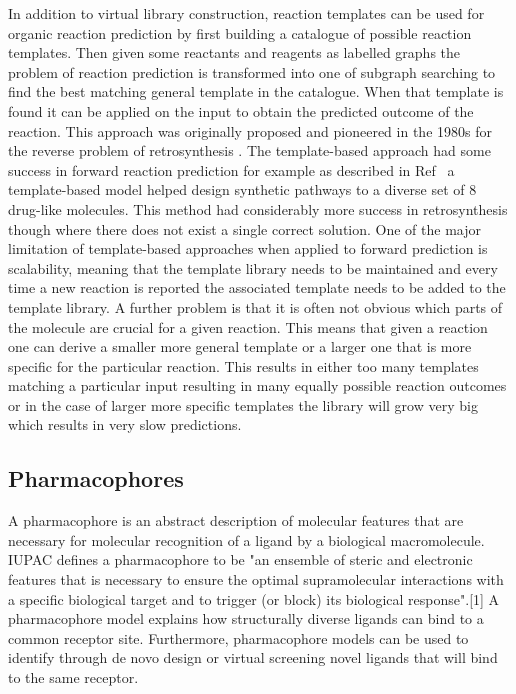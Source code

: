 In addition to virtual library construction, reaction templates can be used for organic reaction prediction by first building a catalogue of possible reaction templates. Then given some reactants and reagents as labelled graphs the problem of reaction prediction is transformed into one of subgraph searching to find the best matching general template in the catalogue. When that template is found it can be applied on the input to obtain the predicted outcome of the reaction. This approach was originally proposed and pioneered in the 1980s for the reverse problem of retrosynthesis \cite{Corey1985ComputerAssistedSynthesis}. The template-based approach had some success in forward reaction prediction for example as described in Ref~\cite{Klucznik2018EfficientLaboratory} a template-based model helped design synthetic pathways to a diverse set of 8 drug-like molecules. This method had considerably more success in retrosynthesis though where there does not exist a single correct solution. One of the major limitation of template-based approaches when applied to forward prediction is scalability, meaning that the template library needs to be maintained and every time a new reaction is reported the associated template needs to be added to the template library. A further problem is that it is often not obvious which parts of the molecule are crucial for a given reaction. This means that given a reaction one can derive a smaller more general template or a larger one that is more specific for the particular reaction. This results in either too many templates matching a particular input resulting in many equally possible reaction outcomes or in the case of larger more specific templates the library will grow very big which results in very slow predictions.

\subsection{Pharmacophores} \label{subsec:pharmacophores}

A pharmacophore is an abstract description of molecular features that are necessary for molecular recognition of a ligand by a biological macromolecule. IUPAC defines a pharmacophore to be "an ensemble of steric and electronic features that is necessary to ensure the optimal supramolecular interactions with a specific biological target and to trigger (or block) its biological response".[1] A pharmacophore model explains how structurally diverse ligands can bind to a common receptor site. Furthermore, pharmacophore models can be used to identify through de novo design or virtual screening novel ligands that will bind to the same receptor.

